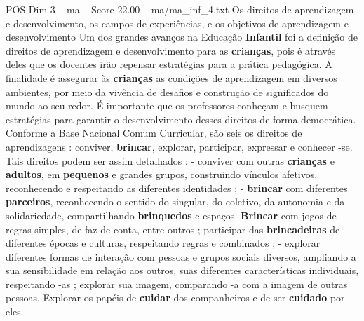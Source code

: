 \begin{textsample}{POS Dim 3 – ma – Score 22.00 – ma/ma\_inf\_4.txt}  \label{ex:f3_pos_143}
Os direitos de aprendizagem e desenvolvimento, os campos de experiências, e os objetivos de aprendizagem e desenvolvimento Um dos grandes avanços na Educação \textbf{Infantil} foi a definição de direitos de aprendizagem e desenvolvimento para as \textbf{crianças}, pois é através deles que os docentes irão repensar estratégias para a prática pedagógica.
A finalidade é assegurar às \textbf{crianças} as condições de aprendizagem em diversos ambientes, por meio da vivência de desafios e construção de significados do mundo ao seu redor.
É importante que os professores conheçam e busquem estratégias para garantir o desenvolvimento desses direitos de forma democrática.
Conforme a Base Nacional Comum Curricular, são seis os direitos de aprendizagens : conviver, \textbf{brincar}, explorar, participar, expressar e conhecer -se.
Tais direitos podem ser assim detalhados : - conviver com outras \textbf{crianças} e \textbf{adultos}, em \textbf{pequenos} e grandes grupos, construindo vínculos afetivos, reconhecendo e respeitando as diferentes identidades ; - \textbf{brincar} com diferentes \textbf{parceiros}, reconhecendo o sentido do singular, do coletivo, da autonomia e da solidariedade, compartilhando \textbf{brinquedos} e espaços. \textbf{Brincar} com jogos de regras simples, de faz de conta, entre outros ; participar das \textbf{brincadeiras} de diferentes épocas e culturas, respeitando regras e combinados ; - explorar diferentes formas de interação com pessoas e grupos sociais diversos, ampliando a sua sensibilidade em relação aos outros, suas diferentes características individuais, respeitando -as ; explorar sua imagem, comparando -a com a imagem de outras pessoas.
Explorar os papéis de \textbf{cuidar} dos companheiros e de ser \textbf{cuidado} por eles.

\end{textsample}
